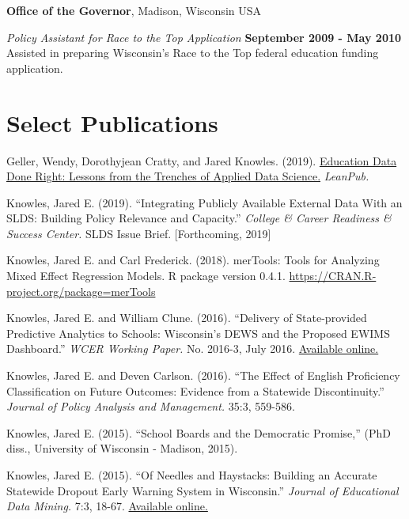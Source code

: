 \documentclass[margin,line]{res}
\newenvironment{list2}{
  \begin{list}{$\bullet$}{%
      \setlength{\itemsep}{0in}
      \setlength{\parsep}{0in} \setlength{\parskip}{0in}
      \setlength{\topsep}{0in} \setlength{\partopsep}{0in} 
      \setlength{\leftmargin}{0.2in}}}{\end{list}}
\begin{document}
\begin{resume}
{\bf Office of the Governor}, Madison, Wisconsin USA

\vspace{-.3cm}
{\em Policy Assistant for Race to the Top Application} \hfill {\bf September 2009 - May 2010}\\
Assisted in preparing Wisconsin's Race to the Top federal education funding 
application. 


\section{\sc Select Publications}

Geller, Wendy, Dorothyjean Cratty, and Jared Knowles. (2019). \uline{Education Data Done Right: Lessons from the Trenches of Applied Data Science.} \emph{LeanPub.}

Knowles, Jared E. (2019). ``Integrating Publicly Available External Data With an SLDS: Building 
Policy Relevance and Capacity.'' \emph{College & Career Readiness & Success Center.} 
SLDS Issue Brief. [Forthcoming, 2019]

Knowles, Jared E. and Carl Frederick. (2018). merTools: Tools for Analyzing Mixed 
Effect Regression Models. R package version 0.4.1. 
\url{https://CRAN.R-project.org/package=merTools}

Knowles, Jared E. and William Clune. (2016). ``Delivery of State-provided Predictive
Analytics to Schools: Wisconsin’s DEWS and the Proposed EWIMS Dashboard.'' 
\emph{WCER Working Paper.} No. 2016-3, July 2016. \href{http://wcer-web.ad.education.wisc.edu/docs/working-papers/Working_Paper_No_2016_03.pdf}{Available online.}

Knowles, Jared E. and Deven Carlson. (2016). ``The Effect of English Proficiency Classification 
on Future Outcomes: Evidence from a Statewide Discontinuity.'' \emph{Journal of Policy Analysis 
and Management.} 35:3, 559-586. 

Knowles, Jared E. (2015). ``School Boards and the Democratic Promise,'' (PhD diss., University of 
Wisconsin - Madison, 2015).

Knowles, Jared E. (2015). ``Of Needles and Haystacks: Building an Accurate Statewide 
Dropout Early Warning System in Wisconsin.'' \emph{Journal of Educational Data 
Mining.} 7:3, 18-67. 
\href{http://www.educationaldatamining.org/JEDM/index.php/JEDM/article/view/JEDM082}{Available online.}


\end{resume}
\end{document}
